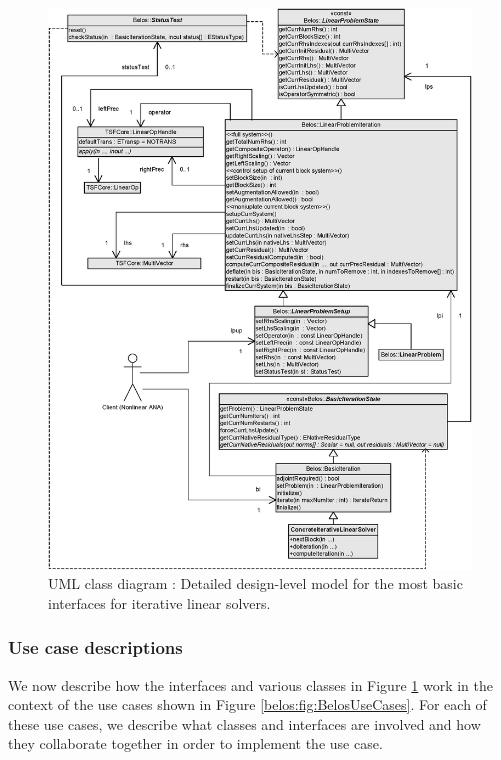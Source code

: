 \documentclass[pdf,ps2pdf,11pt]{SANDreport}
\begin{document}
{\bsinglespace
\begin{figure}
\begin{center}
\includegraphics*[scale=0.72]{BelosInterfaces}
\end{center}
\caption{
\label{belos:fig:BelosInterfaces}
UML class diagram : Detailed design-level model for the most basic
interfaces for iterative linear solvers.}
\end{figure}
\esinglespace}

\subsubsection{Use case descriptions}

We now describe how the interfaces and various classes in Figure
{}\ref{belos:fig:BelosInterfaces} work in the context of the use cases
shown in Figure {}\ref{belos:fig:BelosUseCases}.  For each of these
use cases, we describe what classes and interfaces are involved and
how they collaborate together in order to implement the use case.
\end{document}
